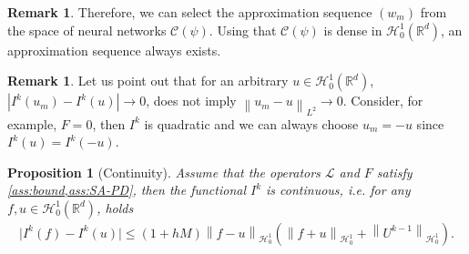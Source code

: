 \documentclass[11pt,a4paper,reqno]{amsart}
\numberwithin{equation}{section}
\theoremstyle{plain}
\newtheorem{proposition}[theorem]{Proposition}
\theoremstyle{definition}
\newtheorem{remark}[theorem]{Remark}
\def\ud{\mathrm d}
\DeclareMathOperator*{\argmin}{arg\,min}
\newcommand{\cH}{\mathcal{H}}
\newcommand{\R}{\mathbb{R}}
\newcommand{\norm}[1]{\left\|#1 \right\|} %
\newcommand{\abs}[1]{\left|#1\right|} %
\begin{document}
\begin{remark}
Therefore, we can select the approximation sequence $(w_m)$ from the space of neural networks $\mathcal{C} \left(\psi\right)$. 
Using that $\mathcal{C} \left(\psi\right)$ is dense in $\cH_0^1 (\R^d)$, an approximation sequence always exists. 
\end{remark}

\begin{remark}
Let us point out that for an arbitrary $u \in \cH_0^1 (\R^d)$, $\abs{I^k \left( u_m \right) - I^k (u)} \to 0$, does not imply $\norm{u_m - u}_{L^2} \to 0$.
Consider, for example, $F = 0$, then $I^k$ is quadratic and we can always choose $u_m = - u$ since $I^k (u) = I^k \left( - u \right)$. 
\end{remark}


\begin{proposition}[Continuity]
\label{prop:functional_convergence}
Assume that the operators $\mathcal L$ and $F$ satisfy \cref{ass:bound,ass:SA-PD}, then the functional $I^k$ is continuous, \emph{i.e.} for any $f, u \in \cH_0^1 (\R^d)$, holds
\begin{align*}
    \big| I^k \left( f \right) - I^k (u) \big| \le \left( 1 + hM \right) \norm{f - u}_{\cH_0^1} \left( \norm{f + u}_{\cH_0^1} + \norm{U^{k - 1}}_{\cH_0^1} \right). 
\end{align*}
\end{proposition}
\end{document}
